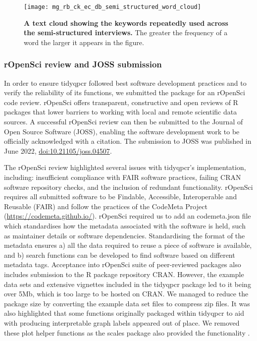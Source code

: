 \documentclass[../main.tex]{subfiles}
\begin{document}
\begin{figure}[t]

{\centering \texttt{[image: mg\_rb\_ck\_ec\_db\_semi\_structured\_word\_cloud]} 

}

\caption[A text cloud showing the keywords repeatedly used across the semi-structured interviews.]{\textbf{A text cloud showing the keywords repeatedly used across the semi-structured interviews.} The greater the frequency of a word the larger it appears in the figure. }\label{fig:semi-structured-test-cloud}
\end{figure}

\subsubsection{rOpenSci review and JOSS submission}
In order to ensure tidyqpcr followed best software development practices and to verify the reliability of its functions, we submitted the package for an rOpenSci code review. 
rOpenSci offers transparent, constructive and open reviews of R packages that lower barriers to working with local and remote scientific data sources.
A successful rOpenSci review can then be submitted to the Journal of Open Source Software (JOSS), enabling the software development work to be officially acknowledged with a citation.
The submission to JOSS was published in June 2022, \href{https://joss.theoj.org/papers/10.21105/joss.04507}{doi:10.21105/joss.04507}.

The rOpenSci review highlighted several issues with tidyqpcr's implementation, including: insufficient compliance with FAIR software practices, failing CRAN software repository checks, and the inclusion of redundant functionality. 
rOpenSci requires all submitted software to be Findable, Accessible, Interoperable and Reusable (FAIR) and follow the practices of the CodeMeta Project (\url{https://codemeta.github.io/}).
rOpenSci required us to add an codemeta.json file which standardises how the metadata associated with the software is held, such as maintainer details or software dependencies.
Standardising the format of the metadata ensures a) all the data required to reuse a piece of software is available, and b) search functions can be developed to find software based on different metadata tags.
Acceptance into rOpenSci suite of peer-reviewed packages also includes submission to the R package repository CRAN.
However, the example data sets and extensive vignettes included in the tidyqpcr package led to it being over 5Mb, which is too large to be hosted on CRAN.
We managed to reduce the package size by converting the example data set files to compress zip files.
It was also highlighted that some functions originally packaged within tidyqpcr to aid with producing interpretable graph labels appeared out of place.
We removed these plot helper functions as the scales package also provided the functionality \parencite{Wickham2022}.
\end{document}
